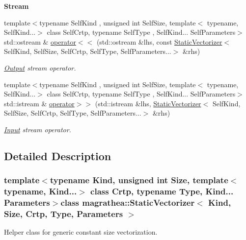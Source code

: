 \begin{Indent}{\bf Stream}\par
\begin{DoxyCompactItemize}
\item 
{\footnotesize template$<$typename Self\-Kind , unsigned int Self\-Size, template$<$ typename, Self\-Kind...$>$ class Self\-Crtp, typename Self\-Type , Self\-Kind... Self\-Parameters$>$ }\\std\-::ostream \& \hyperlink{classmagrathea_1_1StaticVectorizer_abe6a86f2659fddc66d572f8fb8f7d452}{operator$<$$<$} (std\-::ostream \&lhs, const \hyperlink{classmagrathea_1_1StaticVectorizer}{Static\-Vectorizer}$<$ Self\-Kind, Self\-Size, Self\-Crtp, Self\-Type, Self\-Parameters...$>$ \&rhs)
\begin{DoxyCompactList}\small\item\em \hyperlink{exceptionOutput}{Output} stream operator. \end{DoxyCompactList}\item 
{\footnotesize template$<$typename Self\-Kind , unsigned int Self\-Size, template$<$ typename, Self\-Kind...$>$ class Self\-Crtp, typename Self\-Type , Self\-Kind... Self\-Parameters$>$ }\\std\-::istream \& \hyperlink{classmagrathea_1_1StaticVectorizer_a6d8948c3cd04e4f435ed0b8a3f243e75}{operator$>$$>$} (std\-::istream \&lhs, \hyperlink{classmagrathea_1_1StaticVectorizer}{Static\-Vectorizer}$<$ Self\-Kind, Self\-Size, Self\-Crtp, Self\-Type, Self\-Parameters...$>$ \&rhs)
\begin{DoxyCompactList}\small\item\em \hyperlink{exceptionInput}{Input} stream operator. \end{DoxyCompactList}\end{DoxyCompactItemize}
\end{Indent}


\subsection{Detailed Description}
\subsubsection*{template$<$typename Kind, unsigned int Size, template$<$ typename, Kind...$>$ class Crtp, typename Type, Kind... Parameters$>$class magrathea\-::\-Static\-Vectorizer$<$ Kind, Size, Crtp, Type, Parameters $>$}

Helper class for generic constant size vectorization. 

